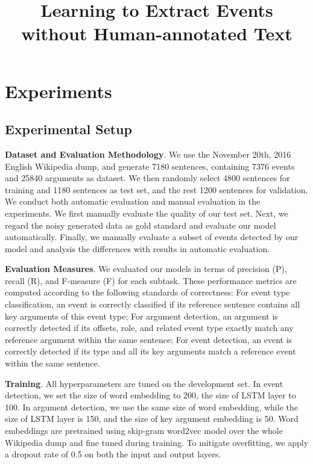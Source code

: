 \documentclass{article}
\title{Learning to Extract Events without Human-annotated Text}
\begin{document}
\maketitle









\section{Experiments}
\subsection{Experimental Setup}
\textbf{Dataset and Evaluation Methodology}. We use the November 20th, 2016 English Wikipedia dump, and generate 7180 sentences, containing 7376 events and 25840 arguments as dataset. We then randomly select 4800 sentences for training and 1180 sentences as test set, and the rest 1200 sentences for validation. We conduct both automatic evaluation and manual evaluation in the experiments. We first manually evaluate the quality of our test set. Next, we regard the noisy generated data as gold standard and evaluate our model automatically. Finally, we manually evaluate a subset of events detected by our model and analysis the differences with results in automatic evaluation.

\noindent \textbf{Evaluation Measures}. We evaluated our models in terms of precision (P), recall (R), and F-measure (F) for each subtask. These performance metrics are computed according to the following standards of correctness: For event type classification, an event is correctly classified if its reference sentence contains all key arguments of this event type; For argument detection, an argument is correctly detected if its offsets, role, and related event type exactly match any reference argument within the same sentence; For event detection, an event is correctly detected if its type and all its key arguments match a reference event within the same sentence.

\noindent \textbf{Training}. All hyperparameters are tuned on the development set. In event detection, we set the size of word embedding to 200, the size of LSTM layer to 100. In argument detection, we use the same size of word embedding, while the size of LSTM layer is 150, and the size of key argument embedding is 50. Word embeddings are pretrained using skip-gram word2vec model \cite{mikolov2013distributed} over the whole Wikipedia dump and fine tuned during training. To mitigate overfitting, we apply a dropout rate of 0.5 on both the input and output layers. 
\end{document}

